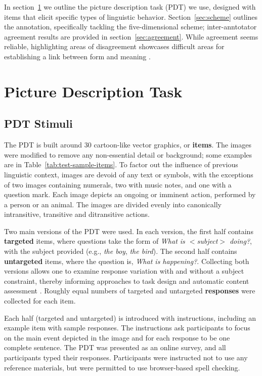\documentclass[11pt,a4paper]{article}
\begin{document}
In section~\ref{sec:pdt} we outline the picture description task (PDT) we use, designed with items that elicit specific types of linguistic behavior.  Section~\ref{sec:scheme} outlines the annotation, specifically tackling the five-dimensional scheme; inter-anntotator agreement results are provided in section~\ref{sec:agreement}.  While agreement seems reliable, highlighting areas of disagreement showcases difficult areas for establishing a link between form and meaning \citep[cf., e.g.,][]{Meurers.Dickinson-17}.

\section{Picture Description Task}
\label{sec:pdt}

\subsection{PDT Stimuli}

The PDT is built around 30 cartoon-like vector graphics, or \textbf{items}. The images were modified to remove any non-essential detail or background; some examples are in Table~\ref{tab:test-sample-items}. To factor out the influence of previous linguistic context, images are devoid of any text or symbols, with the exceptions of two images containing numerals, two with music notes, and one with a question mark. Each image depicts an ongoing or imminent action, performed by a person or an animal. The images are divided evenly into canonically intransitive, transitive and ditransitive actions. 

Two main versions of the PDT were used. In each version, the first half contains \textbf{targeted} items, where questions take the form of \textit{What is $<$subject$>$ doing?}, with the subject provided (e.g., \textit{the boy}, \textit{the bird}). The second half contains \textbf{untargeted} items, where the question is, \textit{What is happening?}. Collecting both versions allows one to examine response variation with and without a subject constraint, thereby informing approaches to task design and automatic content assessment \citep{foster2009native, cho2013investigating}. Roughly equal numbers of targeted and untargeted \textbf{responses} were collected for each item.

Each half (targeted and untargeted) is introduced with instructions, including an example item with sample responses. The instructions ask participants to focus on the main event depicted in the image and for each response to be one complete sentence. The PDT was presented as an online survey, and all participants typed their responses. Participants were instructed not to use any reference materials, but were permitted to use browser-based spell checking.
\end{document}
